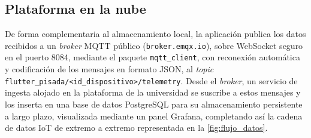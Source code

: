 \begin{IAtext}
\section{Plataforma en la nube}

De forma complementaria al almacenamiento local, la aplicación publica los datos recibidos a un \textit{broker} MQTT público (\texttt{broker.emqx.io}), sobre WebSocket seguro en el puerto 8084, mediante el paquete \texttt{mqtt\_client}, con reconexión automática y codificación de los mensajes en formato JSON, al \textit{topic} \texttt{flutter\_pisada/<id\_dispositivo>/telemetry}. Desde el \textit{broker}, un servicio de ingesta alojado en la plataforma de la universidad se suscribe a estos mensajes y los inserta en una base de datos PostgreSQL para su almacenamiento persistente a largo plazo, visualizada mediante un panel Grafana, completando así la cadena de datos IoT de extremo a extremo representada en la \cref{fig:flujo_datos}.

\end{IAtext}